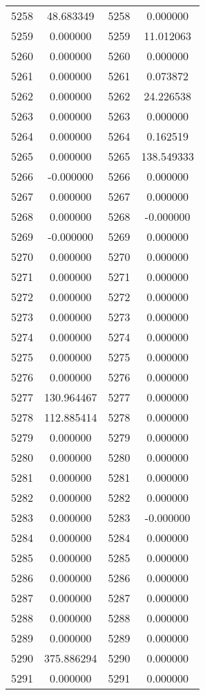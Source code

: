 \documentclass[12pt]{article}
\begin{document}
\begin{longtable}{@{}cccc@{}}
5258 & 48.683349 & 5258 & 0.000000 \\
5259 & 0.000000 & 5259 & 11.012063 \\
5260 & 0.000000 & 5260 & 0.000000 \\
5261 & 0.000000 & 5261 & 0.073872 \\
5262 & 0.000000 & 5262 & 24.226538 \\
5263 & 0.000000 & 5263 & 0.000000 \\
5264 & 0.000000 & 5264 & 0.162519 \\
5265 & 0.000000 & 5265 & 138.549333 \\
5266 & -0.000000 & 5266 & 0.000000 \\
5267 & 0.000000 & 5267 & 0.000000 \\
5268 & 0.000000 & 5268 & -0.000000 \\
5269 & -0.000000 & 5269 & 0.000000 \\
5270 & 0.000000 & 5270 & 0.000000 \\
5271 & 0.000000 & 5271 & 0.000000 \\
5272 & 0.000000 & 5272 & 0.000000 \\
5273 & 0.000000 & 5273 & 0.000000 \\
5274 & 0.000000 & 5274 & 0.000000 \\
5275 & 0.000000 & 5275 & 0.000000 \\
5276 & 0.000000 & 5276 & 0.000000 \\
5277 & 130.964467 & 5277 & 0.000000 \\
5278 & 112.885414 & 5278 & 0.000000 \\
5279 & 0.000000 & 5279 & 0.000000 \\
5280 & 0.000000 & 5280 & 0.000000 \\
5281 & 0.000000 & 5281 & 0.000000 \\
5282 & 0.000000 & 5282 & 0.000000 \\
5283 & 0.000000 & 5283 & -0.000000 \\
5284 & 0.000000 & 5284 & 0.000000 \\
5285 & 0.000000 & 5285 & 0.000000 \\
5286 & 0.000000 & 5286 & 0.000000 \\
5287 & 0.000000 & 5287 & 0.000000 \\
5288 & 0.000000 & 5288 & 0.000000 \\
5289 & 0.000000 & 5289 & 0.000000 \\
5290 & 375.886294 & 5290 & 0.000000 \\
5291 & 0.000000 & 5291 & 0.000000 \\

\end{longtable}
\end{document}
